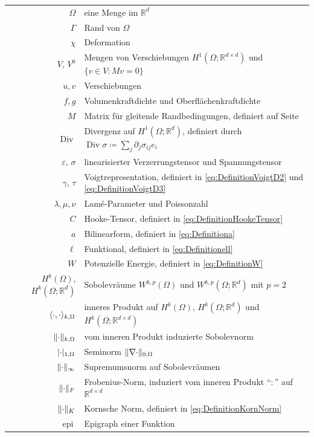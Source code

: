 \documentclass{scrartcl}
\def\R{\mathbb{R}}
\def\e{\varepsilon}
\DeclareMathOperator{\diver}{Div}			%
\DeclareMathOperator{\epi}{epi}			%
\DeclarePairedDelimiter{\abs}{\lvert}{\rvert}
\DeclarePairedDelimiter{\inner}{\langle}{\rangle}
\DeclarePairedDelimiter{\norm}{\lVert}{\rVert}
\begin{document}
\begin{tabular}{rl}
	$\Omega$ & eine Menge im $\R^d$ \\
	$\Gamma$ & Rand von $\Omega$ \\
	$\chi$ & Deformation \\
	$V$, $V^0$ & Mengen von Verschiebungen $H^1(\Omega;\R^{d\times d})$ und $\{v\in V\colon Mv = 0\}$ \\
	$u,v$ & Verschiebungen \\
	$f,g$ & Volumenkraftdichte und Oberflächenkraftdichte \\
	$M$ & Matrix für gleitende Randbedingungen, definiert auf Seite \pageref{ch:DefinitionM}  \\
	$\diver$ & Divergenz auf $H^1(\Omega;\R^d)$, definiert durch $\diver\sigma\coloneqq\sum_{j}\partial_j\sigma_{ij}e_i$ \\
	$\e$, $\sigma$ & linearisierter Verzerrungstensor und Spannungstensor \\
	$\gamma$, $\tau$ & Voigtrepresentation, definiert in \eqref{eq:DefinitionVoigtD2} und \eqref{eq:DefinitionVoigtD3} \\
	$\lambda,\mu,\nu$ & Lamé-Parameter und Poissonzahl \\
	$C$ & Hooke-Tensor, definiert in \eqref{eq:DefinitionHookeTensor} \\
	$a$ & Bilinearform, definiert in \eqref{eq:Definitiona} \\
	$\ell$ & Funktional, definiert in \eqref{eq:Definitionell} \\
	$W$ & Potenzielle Energie, definiert in \eqref{eq:DefinitionW} \\
	$H^k(\Omega)$, $H^k(\Omega;\R^d)$ & Sobolevräume $W^{k,p}(\Omega)$ und $W^{k,p}(\Omega;\R^d)$ mit $p=2$ \\
	$\inner{\cdot,\cdot}_{k,\Omega}$ & inneres Produkt auf $H^k(\Omega)$, $H^k(\Omega;\R^d)$ und $H^k(\Omega;\R^{d\times d})$ \\
	$\norm{\cdot}_{k,\Omega}$ & vom inneren Produkt induzierte Sobolevnorm \\
	$\abs{\cdot}_{1,\Omega}$ & Seminorm $\norm{\nabla\cdot}_{0,\Omega}$ \\
	$\norm{\cdot}_\infty$ & Supremumsnorm auf Sobolevräumen \\
	$\norm{\cdot}_F$ & Frobenius-Norm, induziert vom inneren Produkt "`$:$"' auf $\R^{d\times d}$  \\
	$\norm{\cdot}_K$ & Kornsche Norm, definiert in \eqref{eq:DefinitionKornNorm} \\
	$\epi$ & Epigraph einer Funktion \\

\end{tabular}
\end{document}
